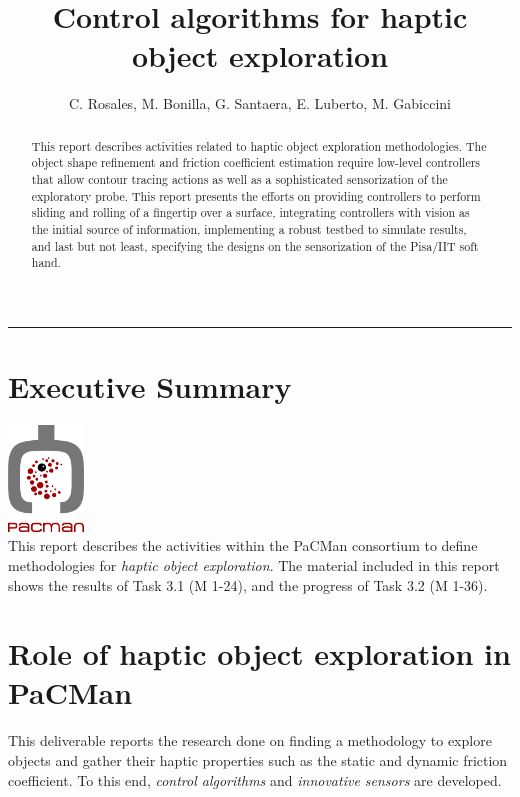 \documentclass[a4paper,11pt,pdf]{pacmanreport}
\title{Control algorithms for haptic object exploration}
\author{C. Rosales, M. Bonilla, G. Santaera, E. Luberto, M. Gabiccini}
\begin{document}
\maketitle

\begin{abstract}
\noindent This report describes activities related to haptic object exploration methodologies. The object shape refinement and friction coefficient estimation require low-level controllers that allow contour tracing actions as well as a sophisticated sensorization of the exploratory probe. This report presents the efforts on providing controllers to perform sliding and rolling of a fingertip over a surface, integrating controllers with vision as the initial source of information, implementing a robust testbed to simulate results, and last but not least, specifying the designs on the sensorization of the Pisa/IIT soft hand.
\end{abstract}


\vspace{.2em}
\hrule

\footnotesize

\tableofcontents

\normalsize

\newpage

\section*{Executive Summary}
\includegraphics[height=80pt]{pacmanlogo.png}\\
This report describes the activities within the PaCMan consortium to define methodologies for \emph{haptic object exploration}. The material included in this report shows the results of Task 3.1 (M 1-24), and the progress of Task 3.2 (M 1-36).

\section*{Role of haptic object exploration in PaCMan}

This deliverable reports the research done on finding a methodology to explore objects and gather their haptic properties such as the static and dynamic friction coefficient. To this end, \emph{control algorithms} and \emph{innovative sensors} are developed.
\end{document}
